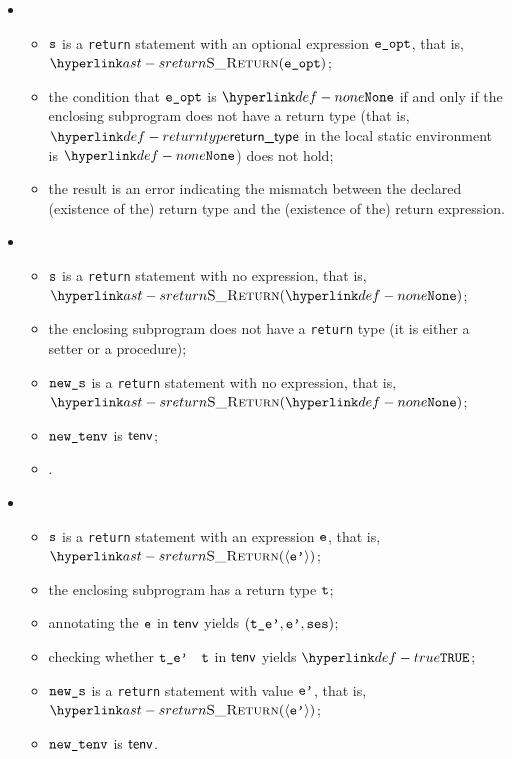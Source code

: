 \ProseParagraph
\OneApplies
\begin{itemize}
  \item {}
  \begin{itemize}
    \item $\vs$ is a \texttt{return} statement with an optional expression $\veopt$, that is, \\
          $\SReturn(\veopt)$;
    \item the condition that $\veopt$ is $\None$ if and only if the enclosing subprogram does not have a return type
          (that is, $\returntype$ in the local static environment is $\None$) does not hold;
    \item the result is an error indicating the mismatch between the declared (existence of the) return type
          and the (existence of the) return expression.
  \end{itemize}

  \item {}
  \begin{itemize}
    \item $\vs$ is a \texttt{return} statement with no expression, that is, $\SReturn(\None)$;
    \item the enclosing subprogram does not have a \texttt{return} type (it is either a setter
          or a procedure);
    \item $\news$ is a \texttt{return} statement with no expression, that is, $\SReturn(\None)$;
    \item $\newtenv$ is $\tenv$;
    \item {}.
  \end{itemize}

  \item {}
  \begin{itemize}
    \item $\vs$ is a \texttt{return} statement with an expression $\ve$, that is, $\SReturn(\langle \vep \rangle)$;
    \item the enclosing subprogram has a return type $\vt$;
    \item annotating the \rhsexpression{} $\ve$ in $\tenv$ yields $(\tep,\vep,\vses)$\ProseOrTypeError;
    \item checking whether $\vtep$ \typesatisfies\ $\vt$ in $\tenv$ yields $\True$\ProseOrTypeError;
    \item $\news$ is a \texttt{return} statement with value $\vep$, that is, $\SReturn(\langle \vep \rangle)$;
    \item $\newtenv$ is $\tenv$.
  \end{itemize}
\end{itemize}
\FormallyParagraph
\begin{mathpar}
\end{mathpar}

